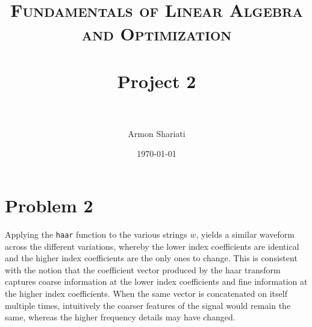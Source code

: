\documentclass[paper=a4, fontsize=11pt]{scrartcl} %
\title{	
    \normalfont \normalsize 
    \textsc{Fundamentals of Linear Algebra and Optimization} \\ [25pt] %
    \horrule{0.5pt} \\[0.4cm] %
    \huge Project 2 \\ %
    \horrule{2pt} \\[0.5cm] %
}
\author{Armon Shariati} %
\date{\normalsize\today} %
\begin{document}
\maketitle %

\section*{Problem 2}

Applying the \texttt{haar} function to the various strings $w$, yields a
similar waveform across the different variations, whereby the lower index
coefficients are identical and the higher index coefficients are the only ones
to change. This is consistent with the notion that the coefficient vector
produced by the haar transform captures coarse information at the lower index
coefficients and fine information at the higher index coefficients. When the
same vector is concatenated on itself multiple times, intuitively the coarser
features of the signal would remain the same, whereas the higher frequency
details may have changed.
\end{document}
